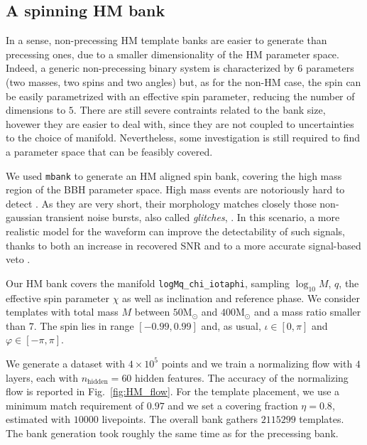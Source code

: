 \documentclass[twocolumn,showpacs,preprintnumbers,nofootinbib,prd,
superscriptaddress,10pt]{revtex4-2}
\begin{document}
\subsection{A spinning HM bank} \label{sec:HM_spinning_bank}

In a sense, non-precessing HM template banks are easier to generate than precessing ones, due to a smaller dimensionality of the HM parameter space. Indeed, a generic non-precessing binary system is characterized by $6$ parameters (two masses, two spins and two angles) but, as for the non-HM case, the spin can be easily parametrized with an effective spin parameter, reducing the number of dimensions to $5$.
There are still severe contraints related to the bank size, hovewer they are easier to deal with, since they are not coupled to uncertainties to the choice of manifold.
Nevertheless, some investigation is still required to find a parameter space that can be feasibly covered.

We used \texttt{mbank} to generate an HM aligned spin bank, covering the high mass region of the BBH parameter space.
High mass events are notoriously hard to detect \cite{LIGOScientific:2021tfm, Chandra:2021wbw}. As they are very short, their morphology matches closely those non-gaussian transient noise bursts, also called {\it glitches}, \cite{Blackburn:2008ah, Zevin:2016qwy, LIGOScientific:2016gtq}. In this scenario, a more realistic model for the waveform can improve the detectability of such signals, thanks to both an increase in recovered SNR and to a more accurate signal-based veto \cite{Babak:2005kv, PhysRevD.95.042001}.

Our HM bank covers the manifold \texttt{logMq\_chi\_iotaphi}, sampling $\log_{10}M$, $q$, the effective spin parameter $\chi$ as well as inclination and reference phase.
We consider templates with total mass $M$ between $50 \mathrm{M_\odot}$ and $400 \mathrm{M_\odot}$ and a mass ratio smaller than $7$. The spin lies in range $[-0.99, 0.99]$ and, as usual, $\iota \in [0, \pi]$ and $\varphi \in [-\pi, \pi]$.

We generate a dataset with $4\times 10^5$ points and we train a normalizing flow with $4$ layers, each with $n_\text{hidden} = 60$ hidden features. The accuracy of the normalizing flow is reported in Fig.~\ref{fig:HM_flow}.
For the template placement, we use a minimum match requirement of $0.97$ and we set a covering fraction $\eta = 0.8$, estimated with $10000$ livepoints.
The overall bank gathers $2115299$ templates.
The bank generation took roughly the same time as for the precessing bank.
\end{document}
